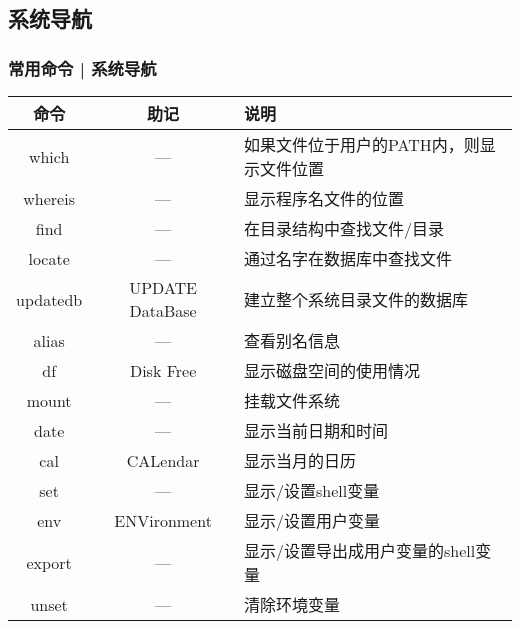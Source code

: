 \subsection{系统导航}
\begin{frame}
  \frametitle{常用命令 | \alert{系统导航}}
  \begin{table}
    \centering
    \begin{tabularx}{\textwidth}{ccX}
      \hline
      \rowcolor{blue!50}命令 & 助记 & 说明\\
      \hline
      which & --- & \scriptsize{如果文件位于用户的PATH内，则显示文件位置}\\
      whereis & --- & 显示程序名文件的位置\\
      find & --- & 在目录结构中查找文件/目录\\
      locate & --- & 通过名字在数据库中查找文件\\
      updatedb & UPDATE DataBase & 建立整个系统目录文件的数据库\\
      alias & --- & 查看别名信息\\
      df & Disk Free & 显示磁盘空间的使用情况\\
      mount & --- & 挂载文件系统\\
      date & --- & 显示当前日期和时间\\
      cal & CALendar & 显示当月的日历\\
      \hline
      set & --- & 显示/设置shell变量\\
      env & ENVironment & 显示/设置用户变量\\
      export & --- & \footnotesize{显示/设置导出成用户变量的shell变量}\\
      unset & --- & 清除环境变量\\
      \hline
    \end{tabularx}
  \end{table}
\end{frame}


